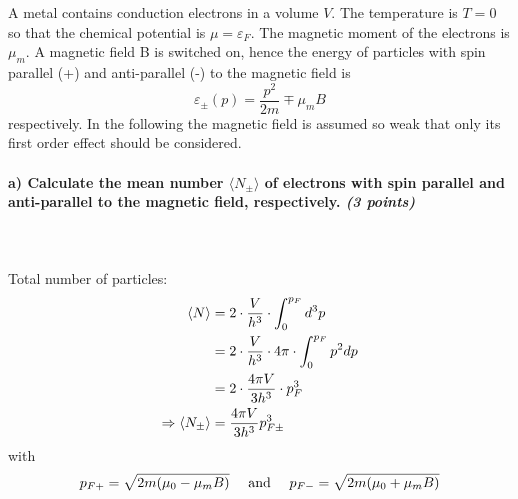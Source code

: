 A metal contains conduction electrons in a volume $V$. 
The temperature is $T=0$ so that the chemical potential is 
$\mu=\varepsilon_F$. The magnetic moment of the electrons 
is $\mu_m$. A magnetic field B is switched on, hence the 
energy of particles with spin parallel (+) and anti-parallel 
(-) to the magnetic field is
\begin{equation}
    \varepsilon_\pm(p)=\frac{p^2}{2m}\mp\mu_mB
\end{equation}
respectively. In the following the magnetic field is assumed 
so weak that only its first order effect should be considered.

\paragraph{a) Calculate the mean number $\langle N_\pm\rangle$ 
    of electrons with spin parallel and anti-parallel to the 
    magnetic field, respectively. \textit{(3 points)}
} \ \\
    \\
    Total number of particles:
    \begin{align}
        \langle N\rangle
        &=2\cdot\frac{V}{h^3}\cdot\int_0^{p_F}d^3p \\
        &=2\cdot\frac{V}{h^3}\cdot4\pi\cdot\int_0^{p_F}p^2dp \\
        &=2\cdot\frac{4\pi V}{3h^3}\cdot p_F^3 \\
        \Rightarrow \langle N_\pm \rangle
        &=\frac{4\pi V}{3h^3}p^3_{F\pm}
    \end{align}
    with
    \begin{align}
        p_{F+}=\sqrt{
            2m(\mu_0-\mu_mB)
        }
        \ \ \ \ \textnormal{and}\ \ \ \
        p_{F-}=\sqrt{
            2m(\mu_0+\mu_mB)
        }
    \end{align}


